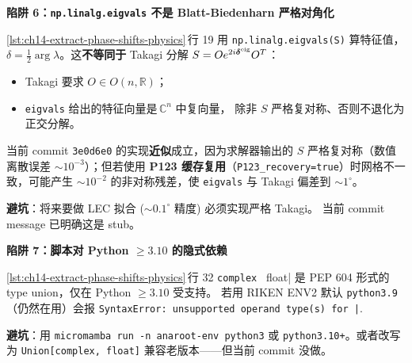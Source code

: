 \begin{pitfallbox}[label={box:ch14-pitfall-eig-vs-takagi}]
\textbf{陷阱 6：\texttt{np.linalg.eigvals} 不是 Blatt-Biedenharn 严格对角化}

\cref{lst:ch14-extract-phase-shifts-physics}\(\,\)行 19 用
\verb|np.linalg.eigvals(S)| 算特征值，
\(\delta = \tfrac{1}{2}\arg \lambda\)。这\textbf{不等同于} Takagi 分解
\(S = O e^{2i\boldsymbol{\delta}^{\rm eig}} O^T\)：
\begin{itemize}
  \item Takagi 要求 \(O \in O(n, \mathbb{R})\)；
  \item \texttt{eigvals} 给出的特征向量是\(\,\mathbb{C}^n\) 中复向量，
        除非 \(S\) 严格复对称、否则不退化为正交分解。
\end{itemize}

当前 commit \texttt{3e0d6e0} 的实现\textbf{近似}成立，因为求解器输出的
\(S\) 严格复对称（数值离散误差 \(\sim 10^{-3}\)）；但若使用\textbf{
P123 缓存复用}（\texttt{P123\_recovery=true}）时网格不一致，可能产生
\(\sim 10^{-2}\) 的非对称残差，使 \texttt{eigvals} 与 Takagi 偏差到
\(\sim 1^\circ\)。

\textbf{避坑}：将来要做 LEC 拟合 (\(\sim 0.1^\circ\) 精度) 必须实现严格 Takagi。
当前 commit message 已明确这是 stub。
\end{pitfallbox}

\begin{pitfallbox}[label={box:ch14-pitfall-py-deps}]
\textbf{陷阱 7：脚本对 Python \(\geq 3.10\) 的隐式依赖}

\cref{lst:ch14-extract-phase-shifts-physics}\(\,\)行 32 \verb|complex | float|
是 PEP 604 形式的 type union，仅在 Python \(\geq 3.10\) 受支持。
若用 RIKEN ENV2 默认 \texttt{python3.9}（仍然在用）会报
\texttt{SyntaxError: unsupported operand type(s) for |}.

\textbf{避坑}：用 \texttt{micromamba run -n anaroot-env python3} 或
\texttt{python3.10+}。或者改写为
\verb|Union[complex, float]| 兼容老版本——但当前 commit 没做。
\end{pitfallbox}

